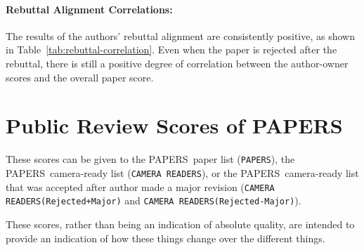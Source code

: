 \documentclass{article} %
\begin{document}
\paragraph{Rebuttal Alignment Correlations:}
The results of the authors' rebuttal alignment are consistently positive, as shown in Table~\ref{tab:rebuttal-correlation}. Even when the paper is rejected after the rebuttal, there is still a positive degree of correlation between the author-owner scores and the overall paper score. 



\section{Public Review Scores of PAPERS}

These scores can be given to the PAPERS\ paper list (\texttt{PAPERS}), the PAPERS\ camera-ready list (\texttt{CAMERA READERS}), or the PAPERS\ camera-ready list that was accepted after author made a major revision (\texttt{CAMERA READERS(Rejected+Major)} and \texttt{CAMERA READERS(Rejected-Major)}).

These scores, rather than being an indication of absolute quality, are intended to provide an indication of how these things change over the different things. 
\end{document}
